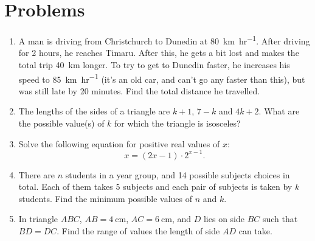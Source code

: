 \documentclass[a4paper,12pt]{article}
\begin{document}

\section*{Problems}
\begin{enumerate}
    \item 
    A man is driving from Christchurch to Dunedin at \SI[per-mode=symbol]{80}{\kilo\meter\per hr}. After driving for 2 hours, he reaches Timaru. After this, he gets a bit lost and makes the total trip \SI{40}{\kilo\meter} longer. To try to get to Dunedin faster, he increases his speed to \SI[per-mode=symbol]{85}{\kilo\meter\per hr} (it's an old car, and can't go any faster than this), but was still late by 20 minutes. Find the total distance he travelled.
    
    \item 
    The lengths of the sides of a triangle are $k+1$, $7-k$ and $4k+2$. What are the possible value(s) of $k$ for which the triangle is isosceles?
    
    \item 
    Solve the following equation for positive real values of $x$:
    \[ x = (2x-1) \cdot 2^{x-1}. \]
    
    \item 
    There are $n$ students in a year group, and 14 possible subjects choices in total. Each of them takes 5 subjects and each pair of subjects is taken by $k$ students. Find the minimum possible values of $n$ and $k$.
    
    \item 
    In triangle $ABC$, $AB=\SI{4}{\centi\meter}$, $AC=\SI{6}{\centi\meter}$, and $D$ lies on side $BC$ such that $BD=DC$. Find the range of values the length of side $AD$ can take.
    
    \begin{center}
    \end{center}
    

\end{enumerate}
\end{document}
